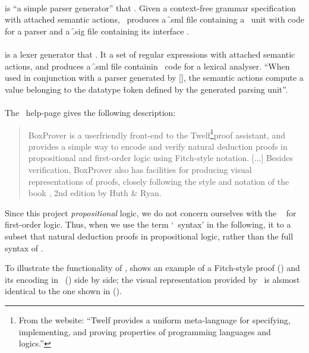 \documentclass[BA.tex]{subfiles}
\begin{document}
\paragraph{\yac} is ``a simple parser generator''\cite[p.~44]{mosman}
 that  \mos .
 Given a context-free grammar specification with attached semantic actions,
 \yac\ produces a \f{.sml} file containing a \mos\ unit with code for
 a parser and a \f{.sig} file containing its interface
 \cite[]{mosman}.

\paragraph{\lex} is a lexer generator that  \mos . It 
  a set of regular expressions with attached semantic actions,
 and produces a \f{.sml} file containin \mos\ code for a lexical
 analyser\cite[p.~40]{mosman}. ``When used in conjunction with a parser
 generated by [\yac], the semantic actions compute a value belonging to
 the datatype \f{token} defined by the generated parsing 
 unit''\cite[\emph{ibid.}]{mosman}.

\paragraph{\bp} The \bp\ help-page\cite{boxhelp} gives the following
 description:
\begin{quote}
BoxProver is a userfriendly front-end to the Twelf\footnote{From
 the  website\cite{twelf}: ``Twelf provides a uniform meta-language
 for specifying, implementing, and proving properties of programming
 languages and logics.''}proof assistant, and
 provides a simple way to encode and verify natural deduction proofs in
 propositional and first-order logic using Fitch-style notation. [...] 
 Besides verification, BoxProver also has facilities for producing visual
 representations of proofs, closely following the style and notation of
 the book \book, 2nd edition by Huth \& Ryan.
\end{quote}
Since this project  \emph{propositional} logic, we do not
 concern ourselves with the \bp\  for first-order logic. 
 Thus, when we use the term `\bp\ syntax' in the following, it 
 to a subset that  natural deduction proofs in propositional
 logic, rather than the full syntax of \bp.

To illustrate the functionality of \bp ,  shows an example
 of a Fitch-style proof () and its encoding in \bp\ 
 () side by side; the visual representation provided by
 \bp\ is alsmost identical to the one shown in (\subref{sf:fs}).
\end{document}
